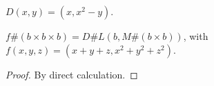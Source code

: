 \begin{definition}
    \label{decoder}
    \leanok
    $D(x,y) = (x, x^2 - y)$.
\end{definition}

\begin{lemma}
    \label{jurl}
    \leanok
    $f \# (b \times b \times b) = D \# L(b, M \# (b \times b))$, with $f(x, y, z) = (x+y+z, x^2+y^2+z^2)$.
\end{lemma}

\begin{proof}
    \leanok
    By direct calculation.
\end{proof}